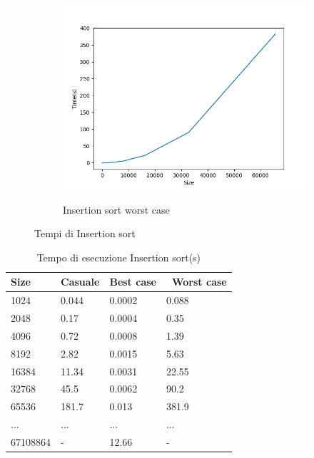 \documentclass[]{article}
\begin{document}
\begin{figure}[H]
    \begin{subfigure}[b]{0.4\linewidth}
        \centering
        \caption{Insertion sort worst case}
        \includegraphics[width=\textwidth]{InsertionSortWorstCase}
        \label{fig:insertion_worst}
    \end{subfigure}
	\caption{Tempi di Insertion sort}    
    \label{fig:insertion}
\end{figure}

\begin{table}[H]
\centering
\caption{Tempo di esecuzione Insertion sort(s)}
\label{tab:insertion}
\begin{tabular}{|l|l|l|l|} 
\hline
Size     & Casuale & Best case & ~Worst case  \\ 
\hline
1024     & 0.044   & 0.0002    & 0.088        \\
2048     & 0.17    & 0.0004    & 0.35         \\
4096     & 0.72    & 0.0008    & 1.39         \\
8192     & 2.82    & 0.0015    & 5.63         \\
16384    & 11.34   & 0.0031    & 22.55        \\
32768    & 45.5    & 0.0062    & 90.2         \\
65536    & 181.7   & 0.013     & 381.9        \\
...      & ...     & ...       & ...          \\
67108864 & -       & 12.66     & -            \\
\hline
\end{tabular}
\end{table}
\end{document}

